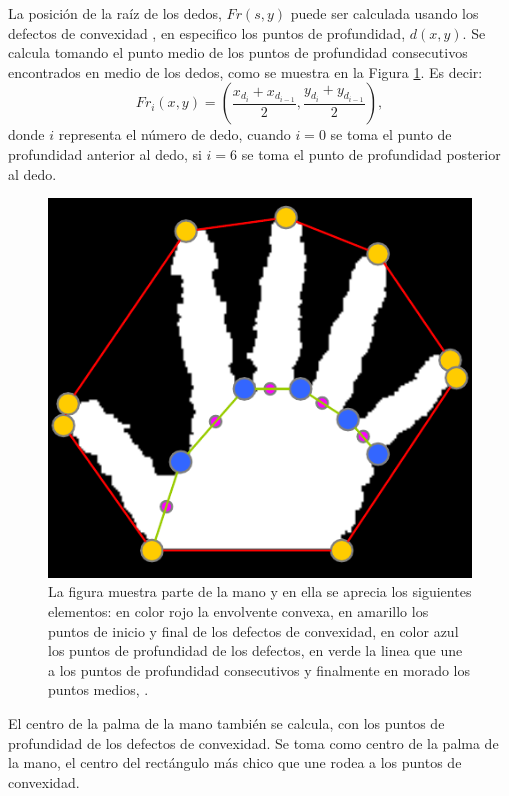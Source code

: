 La posición de la raíz de los dedos, $Fr(s,y)$ puede ser calculada usando los defectos de convexidad \citep{Hummel2014}, en especifico los puntos de profundidad, $d(x,y)$. Se calcula tomando el punto medio de los puntos de profundidad consecutivos encontrados en medio de los dedos, como se muestra en la Figura \ref{fig:RootFingers}. Es decir: 
\begin{equation}
Fr_i(x,y)= \left( \frac{ x_{d_i}+x_{d_{i-1}} }{2},\frac{y_{d_i}+y_{d_{i-1}}}{2}  \right),
\end{equation}
donde $i$ representa el número de dedo, cuando $i=0$ se toma el punto de profundidad anterior al dedo, si $i=6$ se toma el punto de profundidad posterior al dedo. 

\begin{figure}[h!]
\begin{center}
\includegraphics[scale=.55]{./Figures/rootFingers.png}
\end{center}
\caption{La figura muestra parte de la mano y en ella se aprecia los siguientes elementos: en color rojo la envolvente convexa, en amarillo los puntos de inicio y final de los defectos de convexidad,  en color azul los puntos de profundidad de los defectos, en verde la linea que une a los puntos de profundidad consecutivos y finalmente en morado los puntos medios, \protect\citep{Hummel2014}.} 
\label{fig:RootFingers}
\end{figure} 

El centro de la palma de la mano también se calcula, con los puntos de profundidad de los defectos de convexidad. Se toma como centro de la palma de la mano, el centro del rectángulo más chico que une rodea a los puntos de convexidad. 

